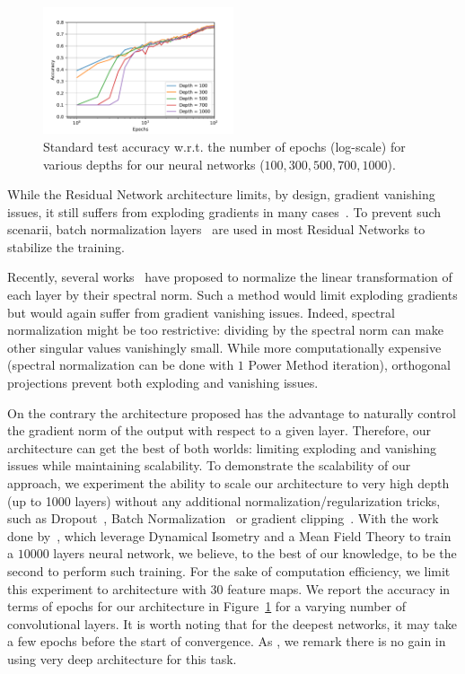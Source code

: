 \begin{figure}[h]
    \centering
    \includegraphics[width=0.5\textwidth]{sections/4_certification/images/final_cifar10_veryverydeep.pdf}
    \caption{Standard test accuracy w.r.t. the number of epochs (log-scale) for various depths for our neural networks ($100,300,500,700,1000$).}
    \label{fig:verydeep}
\end{figure}

While the Residual Network architecture limits, by design, gradient vanishing issues, it still suffers from exploding gradients in many cases~\citep{hayou2021stable}.
To prevent such scenarii, batch normalization layers~\citep{ioffe2015batch} are used in most Residual Networks to stabilize the training.

Recently, several works~\citep{miyato2018spectral,farnia2018generalizable} have proposed to normalize the linear transformation of each layer by their spectral norm.
Such a method would limit exploding gradients but would again suffer from gradient vanishing issues.
Indeed, spectral normalization might be too restrictive: dividing by the spectral norm can make other singular values vanishingly
small.
While more computationally expensive (spectral normalization can be done with $1$ Power Method iteration), orthogonal projections prevent both exploding and vanishing issues. 

On the contrary the architecture proposed  has the advantage to naturally control the gradient norm of the output with respect to a given layer.
Therefore, our architecture can get the best of both worlds: limiting exploding and vanishing issues while maintaining scalability. 
To demonstrate the scalability of our approach, we experiment the ability to scale our architecture to very high depth (up to 1000 layers) without any additional normalization/regularization tricks, such as Dropout~\citep{srivastava2014dropout}, Batch Normalization~\citep{ioffe2015batch} or gradient clipping~\citep{pascanu2013difficulty}.
With the work done by~\cite{xiao2018dynamical}, which leverage Dynamical Isometry and a Mean Field Theory to train a $10000$ layers neural network, we believe, to the best of our knowledge, to be the second to perform such training. 
For the sake of computation efficiency, we limit this experiment to architecture with $30$ feature maps.
We report the accuracy in terms of epochs for our architecture in Figure~\ref{fig:verydeep} for a varying number of convolutional layers.
It is worth noting that for the deepest networks, it may take a few epochs before the start of convergence.
As \cite{xiao2018dynamical}, we remark there is no gain in using very deep architecture for this task.


